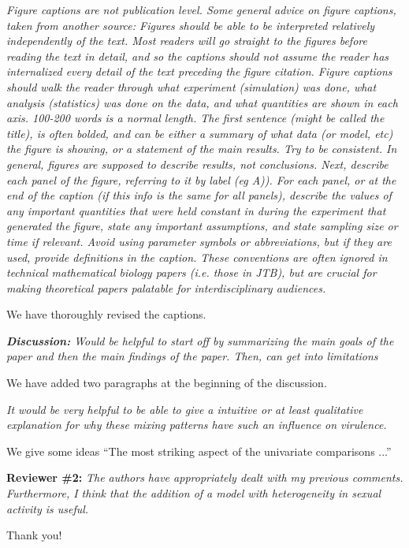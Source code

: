 \documentclass[10pt]{letter}
\newcommand{\revcomment}[1]{\emph{#1}}
\newcommand{\response}[1]{#1}
\begin{document}
\begin{letter}{
}
\revcomment{
Figure captions are not publication level. Some general advice on figure captions, taken from another source: Figures should be able to be interpreted relatively independently of the text. Most readers will go straight to the figures before reading the text in detail, and so the captions should not assume the reader has internalized every detail of the text preceding the figure citation. Figure captions should walk the reader through what experiment (simulation) was done, what analysis (statistics) was done on the data, and what quantities are shown in each axis. 100-200 words is a normal length. The first sentence (might be called the title), is often bolded, and can be either a summary of what data (or model, etc) the figure is showing, or a statement of the main results. Try to be consistent. In general, figures are supposed to describe results, not conclusions. Next, describe each panel of the figure, referring to it by label (eg A)). For each panel, or at the end of the caption (if this info is the same for all panels), describe the values of any important quantities that were held constant in during the experiment that generated the figure, state any important assumptions, and state sampling size or time if relevant. Avoid using parameter symbols or abbreviations, but if they are used, provide definitions in the caption. These conventions are often ignored in technical mathematical biology papers (i.e. those in JTB), but are crucial for making theoretical papers palatable for interdisciplinary audiences.
}

\response{
We have thoroughly revised the captions.
}

\revcomment{
\textbf{Discussion:}
Would be helpful to start off by summarizing the main goals of the paper and then the main findings of the paper. Then, can get into limitations
}
\response{
We have added two paragraphs at the beginning of the discussion.
}

\revcomment{
It would be very helpful to be able to give a intuitive or at least qualitative explanation for why these mixing patterns have such an influence on virulence.
}
\response{
We give some ideas
``The most striking aspect of the univariate comparisons ...''

}

\textbf{Reviewer \#2:}
\revcomment{
 The authors have appropriately dealt with my previous comments. Furthermore, I think that the addition of a model with heterogeneity in sexual activity is useful.
}

\response{
Thank you!
}


\end{letter}
\end{document}
